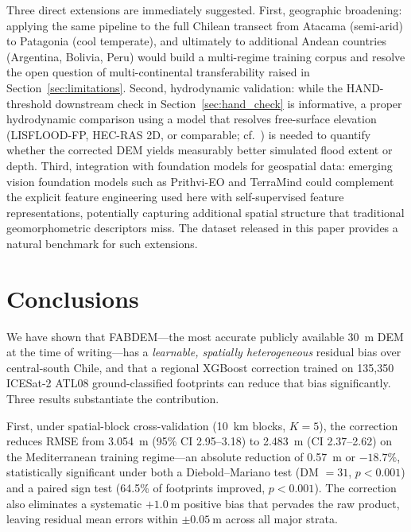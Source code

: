 \documentclass[preprint,authoryear,number]{elsarticle}
\begin{document}
Three direct extensions are immediately suggested. First, geographic broadening: applying the same pipeline to the full Chilean transect from Atacama (semi-arid) to Patagonia (cool temperate), and ultimately to additional Andean countries (Argentina, Bolivia, Peru) would build a multi-regime training corpus and resolve the open question of multi-continental transferability raised in Section~\ref{sec:limitations}. Second, hydrodynamic validation: while the HAND-threshold downstream check in Section~\ref{sec:hand_check} is informative, a proper hydrodynamic comparison using a model that resolves free-surface elevation (LISFLOOD-FP, HEC-RAS 2D, or comparable; cf.\ \citealt{Hawker2024Vietnam}) is needed to quantify whether the corrected DEM yields measurably better simulated flood extent or depth. Third, integration with foundation models for geospatial data: emerging vision foundation models such as Prithvi-EO and TerraMind could complement the explicit feature engineering used here with self-supervised feature representations, potentially capturing additional spatial structure that traditional geomorphometric descriptors miss. The dataset released in this paper provides a natural benchmark for such extensions.


\section{Conclusions}
\label{sec:conclusions}

We have shown that FABDEM---the most accurate publicly available \SI{30}{\meter} DEM at the time of writing---has a \emph{learnable, spatially heterogeneous} residual bias over central-south Chile, and that a regional XGBoost correction trained on 135{,}350 ICESat-2 ATL08 ground-classified footprints can reduce that bias significantly. Three results substantiate the contribution.

First, under spatial-block cross-validation (\SI{10}{\kilo\meter} blocks, $K = 5$), the correction reduces RMSE from \SI{3.054}{\meter} (95\% CI 2.95--3.18) to \SI{2.483}{\meter} (CI 2.37--2.62) on the Mediterranean training regime---an absolute reduction of \SI{0.57}{\meter} or $-18.7\%$, statistically significant under both a Diebold--Mariano test (DM $= 31$, $p < 0.001$) and a paired sign test (64.5\% of footprints improved, $p < 0.001$). The correction also eliminates a systematic $+\SI{1.0}{\meter}$ positive bias that pervades the raw product, leaving residual mean errors within $\pm \SI{0.05}{\meter}$ across all major strata.
\end{document}
